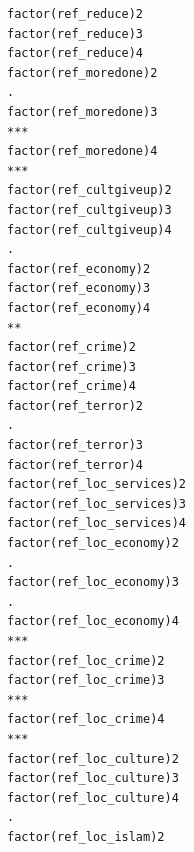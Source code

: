 \documentclass[
]{article}
\begin{document}
\begin{table}
\begin{minipage}[t]{\linewidth}
{\begin{verbatim}
factor(ref_reduce)2                                                                  
factor(ref_reduce)3                                                                  
factor(ref_reduce)4                                                                  
factor(ref_moredone)2                                                             .  
factor(ref_moredone)3                                                             ***
factor(ref_moredone)4                                                             ***
factor(ref_cultgiveup)2                                                              
factor(ref_cultgiveup)3                                                              
factor(ref_cultgiveup)4                                                           .  
factor(ref_economy)2                                                                 
factor(ref_economy)3                                                                 
factor(ref_economy)4                                                              ** 
factor(ref_crime)2                                                                   
factor(ref_crime)3                                                                   
factor(ref_crime)4                                                                   
factor(ref_terror)2                                                               .  
factor(ref_terror)3                                                                  
factor(ref_terror)4                                                                  
factor(ref_loc_services)2                                                            
factor(ref_loc_services)3                                                            
factor(ref_loc_services)4                                                            
factor(ref_loc_economy)2                                                          .  
factor(ref_loc_economy)3                                                          .  
factor(ref_loc_economy)4                                                          ***
factor(ref_loc_crime)2                                                               
factor(ref_loc_crime)3                                                            ***
factor(ref_loc_crime)4                                                            ***
factor(ref_loc_culture)2                                                             
factor(ref_loc_culture)3                                                             
factor(ref_loc_culture)4                                                          .  
factor(ref_loc_islam)2                                                               

\end{verbatim}}
\end{minipage}
\end{table}
\end{document}
